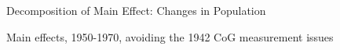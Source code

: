 \documentclass{article}
\begin{document}
\begin{table}[htbp]
\centering
\scriptsize

\begin{threeparttable}
\caption{Decomposition of Main Effect: Changes in Population}
\label{tab:decomp_pop}
        \end{threeparttable}
 \end{table}
\clearpage

\begin{table}[htbp]
\footnotesize
\centering {}  \begin{threeparttable} \caption{Main effects, 1950-1970, avoiding the 1942 CoG measurement issues}
\label{tab:main_effect_1950_1970}
     \end{threeparttable}  \end{table}
\clearpage
\end{document}
